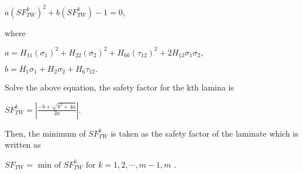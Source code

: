 $a(SF_{TW}^k)^2 + b(SF_{TW}^k) - 1 = 0 \textstyle{,}$

where 


$a = H_{11}(\sigma_1)^2 + H_{22}(\sigma_2)^2 +H_{66}(\tau_{12})^2 +
2H_{12}\sigma_1 \sigma_2 \textstyle{,} $


$b = H_1\sigma_1 + H_2 \sigma_2 + H_6 \tau_{12} \textstyle{.}$ 


Solve the above equation, the safety factor for the kth lamina is 

$SF_{TW}^k = |\frac{-b+ \sqrt{b^2 + 4a}}{2a}|$.

Then, the minimum of $SF_{TW}^k$ is taken as the safety factor of the
laminate which is written as

$SF_{TW}= \text{ min of } SF_{TW}^k \text{ for } k=1,2,\cdots, m-1,m$ .


